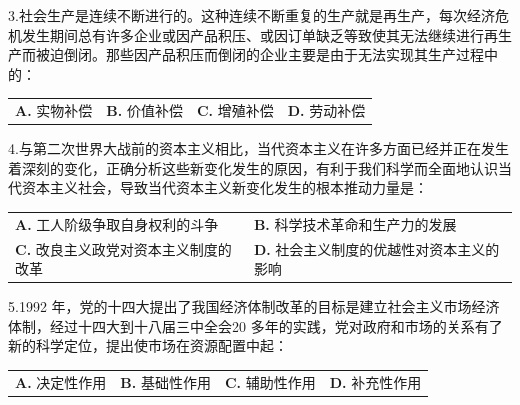 \documentclass[UTF8,11pt]{ctexart}
\begin{document}
3.社会生产是连续不断进行的。这种连续不断重复的生产就是再生产，每次经济危机发生期间总有许多企业或因产品积压、或因订单缺乏等致使其无法继续进行再生产而被迫倒闭。那些因产品积压而倒闭的企业主要是由于无法实现其生产过程中的：


\begin{center}\begin{tabular}{>{\raggedright\arraybackslash}p{\dimexpr(\linewidth-8\tabcolsep)/4\relax}>{\raggedright\arraybackslash}p{\dimexpr(\linewidth-8\tabcolsep)/4\relax}>{\raggedright\arraybackslash}p{\dimexpr(\linewidth-8\tabcolsep)/4\relax}>{\raggedright\arraybackslash}p{\dimexpr(\linewidth-8\tabcolsep)/4\relax}}
\textbf{A.} 实物补偿 & \textbf{B.} 价值补偿 & \textbf{C.} 增殖补偿 & \textbf{D.} 劳动补偿\\[.35em]\end{tabular}\end{center}

4.与第二次世界大战前的资本主义相比，当代资本主义在许多方面已经并正在发生着深刻的变化，正确分析这些新变化发生的原因，有利于我们科学而全面地认识当代资本主义社会，导致当代资本主义新变化发生的根本推动力量是：


\begin{center}\begin{tabular}{>{\raggedright\arraybackslash}p{\dimexpr(\linewidth-4\tabcolsep)/2\relax}>{\raggedright\arraybackslash}p{\dimexpr(\linewidth-4\tabcolsep)/2\relax}}
\textbf{A.} 工人阶级争取自身权利的斗争 & \textbf{B.} 科学技术革命和生产力的发展\\[.35em]
\textbf{C.} 改良主义政党对资本主义制度的改革 & \textbf{D.} 社会主义制度的优越性对资本主义的影响\\[.35em]\end{tabular}\end{center}

5.1992 年，党的十四大提出了我国经济体制改革的目标是建立社会主义市场经济体制，经过十四大到十八届三中全会20 多年的实践，党对政府和市场的关系有了新的科学定位，提出使市场在资源配置中起：


\begin{center}\begin{tabular}{>{\raggedright\arraybackslash}p{\dimexpr(\linewidth-8\tabcolsep)/4\relax}>{\raggedright\arraybackslash}p{\dimexpr(\linewidth-8\tabcolsep)/4\relax}>{\raggedright\arraybackslash}p{\dimexpr(\linewidth-8\tabcolsep)/4\relax}>{\raggedright\arraybackslash}p{\dimexpr(\linewidth-8\tabcolsep)/4\relax}}
\textbf{A.} 决定性作用 & \textbf{B.} 基础性作用 & \textbf{C.} 辅助性作用 & \textbf{D.} 补充性作用\\[.35em]\end{tabular}\end{center}
\end{document}
